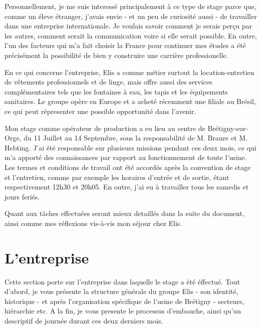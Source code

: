 \documentclass{article}
\begin{document}
Personnellement, je me suis interessé principalement à ce type de stage parce
que, comme un éleve étranger, j'avais envie - et un peu de curiosité aussi - de
travailler dans une entreprise internationale. Je voulais savoir comment je
serais perçu par les autres, comment serait la communication voire si elle
serait possible. En outre, l'un des facteurs qui m'a fait choisir la France
pour continuer mes études a été précisément la possibilité de bien y construire
une carrière professionelle.

\vspace{12pt}

En ce qui concerne l'entreprise, Elis a comme métier surtout la
location-entretien de vêtements professionnels et de linge, mais offre aussi
des services complémentaires tels que les fontaines à eau, les tapis et les
équipements sanitaires. Le groupe opère en Europe et a acheté récemment une
filiale au Brésil, ce qui peut répresenter une possible opportunité dans
l'avenir.

\vspace{12pt}

Mon stage comme opérateur de production a eu lieu au centre de
Brétigny-sur-Orge, du 11 Juillet au 14 Septembre, sous la responsabilité de M.
Braure et M. Hebting. J'ai été responsable sur plusieurs missions pendant ces
deux mois, ce qui m'a apporté des connaissances par rapport au fonctionnement
de toute l'usine. Les termes et conditions de travail ont été accordés après la
convention de stage et l'entretien, comme par exemple les horaires d'entrée et
de sortie, étant respectivement 12h30 et 20h05. En outre, j'ai eu à travailler
tous les samedis et jours feriés.

\vspace{12pt}

Quant aux tâches effectuées seront mieux detaillés dans la suite du
document, ainsi comme mes réflexions vis-à-vis mon séjour chez Elis.

\newpage
\section{L'entreprise}

Cette section porte sur l'entreprise dans laquelle le stage a été éffectué. Tout
d'abord, je vous présente la structure générale du groupe Elis - son identité,
historique - et après l'organisation spécifique de l'usine de Brétigny -
secteurs, hiérarchie etc. A la fin, je vous presente le processus d'embauche,
ainsi qu'un descriptif de journée durant ces deux derniers mois.
\end{document}

